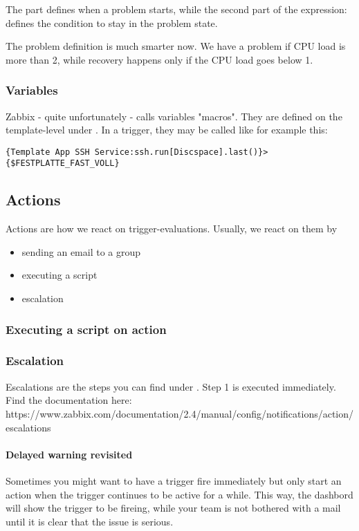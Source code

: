  The  part defines when a problem starts, while the second part of the expression:  defines the condition to stay in the problem state.

The problem definition is much smarter now. We have a problem if CPU load is more than 2, while recovery happens only if the CPU load goes below 1.

\subsubsection{Variables}
Zabbix - quite unfortunately - calls variables "macros". They are defined on the template-level under . In a trigger, they may be called like for example this: 
\begin{lstlisting}
{Template App SSH Service:ssh.run[Discspace].last()}>{$FESTPLATTE_FAST_VOLL}
\end{lstlisting}


\subsection{Actions}
Actions are how we react on trigger-evaluations. Usually, we react on them by
\begin{itemize}
    \item sending an email to a group
    \item executing a script 
    \item escalation
\end{itemize}

\subsubsection{Executing a script on action}

\subsubsection{Escalation}
Escalations are the steps you can find under .
Step 1 is executed immediately. Find the documentation here: https://www.zabbix.com/documentation/2.4/manual/config/notifications/action/escalations

\paragraph{Delayed warning revisited} Sometimes you might want to have a trigger fire immediately but only start an action when the trigger continues to be active for a while. This way, the dashbord will show the trigger to be fireing, while your team is not bothered with a mail until it is clear that the issue is serious. 


